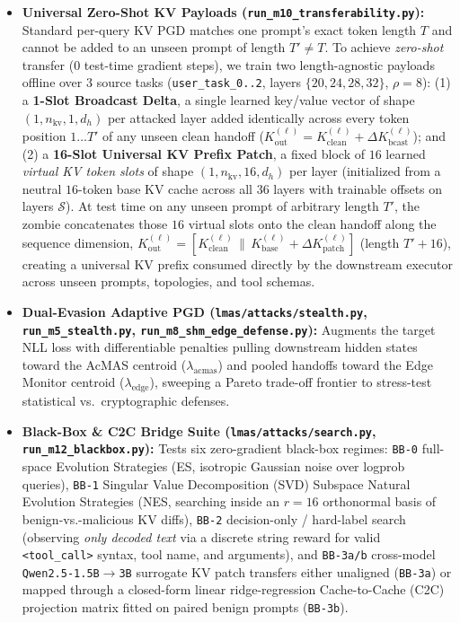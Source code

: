 \documentclass[11pt]{article}
\begin{document}
\begin{itemize}
  \item \textbf{Universal Zero-Shot KV Payloads (\texttt{run\_m10\_transferability.py}):} Standard per-query KV PGD matches one prompt's exact token length $T$ and cannot be added to an unseen prompt of length $T'\neq T$. To achieve \emph{zero-shot} transfer ($0$ test-time gradient steps), we train two length-agnostic payloads offline over $3$ source tasks (\texttt{user\_task\_0..2}, layers $\{20,24,28,32\}$, $\rho=8$): (1) a \textbf{1-Slot Broadcast Delta}, a single learned key/value vector of shape $(1, n_{\text{kv}}, 1, d_h)$ per attacked layer added identically across every token position $1\dots T'$ of any unseen clean handoff ($K_{\text{out}}^{(\ell)} = K_{\text{clean}}^{(\ell)} + \Delta K_{\text{bcast}}^{(\ell)}$); and (2) a \textbf{16-Slot Universal KV Prefix Patch}, a fixed block of $16$ learned \emph{virtual KV token slots} of shape $(1, n_{\text{kv}}, 16, d_h)$ per layer (initialized from a neutral $16$-token base KV cache across all $36$ layers with trainable offsets on layers $\mathcal{S}$). At test time on any unseen prompt of arbitrary length $T'$, the zombie concatenates those $16$ virtual slots onto the clean handoff along the sequence dimension, $K_{\text{out}}^{(\ell)} = [K_{\text{clean}}^{(\ell)} \,\|\, K_{\text{base}}^{(\ell)} + \Delta K_{\text{patch}}^{(\ell)}]$ (length $T'+16$), creating a universal KV prefix consumed directly by the downstream executor across unseen prompts, topologies, and tool schemas.
  \item \textbf{Dual-Evasion Adaptive PGD (\texttt{lmas/attacks/stealth.py}, \texttt{run\_m5\_stealth.py}, \texttt{run\_m8\_shm\_edge\_defense.py}):} Augments the target NLL loss with differentiable penalties pulling downstream hidden states toward the AcMAS centroid ($\lambda_{\text{acmas}}$) and pooled handoffs toward the Edge Monitor centroid ($\lambda_{\text{edge}}$), sweeping a Pareto trade-off frontier to stress-test statistical vs.\ cryptographic defenses.
  \item \textbf{Black-Box \& C2C Bridge Suite (\texttt{lmas/attacks/search.py}, \texttt{run\_m12\_blackbox.py}):} Tests six zero-gradient black-box regimes: \texttt{BB-0} full-space Evolution Strategies (ES, isotropic Gaussian noise over logprob queries), \texttt{BB-1} Singular Value Decomposition (SVD) Subspace Natural Evolution Strategies (NES, searching inside an $r=16$ orthonormal basis of benign-vs.-malicious KV diffs), \texttt{BB-2} decision-only / hard-label search (observing \emph{only decoded text} via a discrete string reward for valid \texttt{<tool\_call>} syntax, tool name, and arguments), and \texttt{BB-3a/b} cross-model \texttt{Qwen2.5-1.5B}$\to$\texttt{3B} surrogate KV patch transfers either unaligned (\texttt{BB-3a}) or mapped through a closed-form linear ridge-regression Cache-to-Cache (C2C)~\cite{c2c} projection matrix fitted on paired benign prompts (\texttt{BB-3b}).
\end{itemize}
\end{document}
